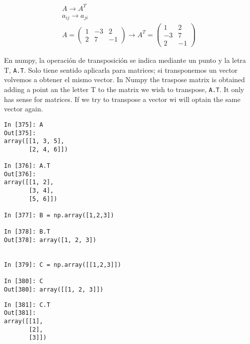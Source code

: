 \begin{gather*}
A \rightarrow  A^T\\
a_{ij} \rightarrow  a_{ji}\\
A=
\begin{pmatrix}
1& -3& 2 \\
2& 7& -1
\end{pmatrix}  \rightarrow 
A^T=
\begin{pmatrix}
1& 2 \\
-3& 7\\
2 & -1
\end{pmatrix}
\end{gather*}

\begin{paracol}{2}
En numpy, la operación de transposición se indica mediante un punto y la letra T, \texttt{A.T}. Solo tiene sentido aplicarla para matrices; si transponemos un vector volvemos a obtener el mismo vector.
\switchcolumn
In Numpy the traspose matrix is obtained adding a point an the letter T to the matrix we wish to transpose, \texttt{A.T}. It only has sense for matrices. If we try to transpose a vector wi will optain the same vector again.
\end{paracol}

\begin{center}
    \begin{minipage}{0.5\textwidth}
        \begin{verbatim}
In [375]: A
Out[375]: 
array([[1, 3, 5],
       [2, 4, 6]])

In [376]: A.T
Out[376]: 
array([[1, 2],
       [3, 4],
       [5, 6]])

In [377]: B = np.array([1,2,3]) 

In [378]: B.T
Out[378]: array([1, 2, 3])


In [379]: C = np.array([[1,2,3]])

In [380]: C
Out[380]: array([[1, 2, 3]])
        \end{verbatim}
    \end{minipage}
\end{center}
\begin{center}
    \begin{minipage}{0.5\textwidth}
        \begin{verbatim}
In [381]: C.T
Out[381]: 
array([[1],
       [2],
       [3]])
        \end{verbatim}
    \end{minipage}
\end{center}

